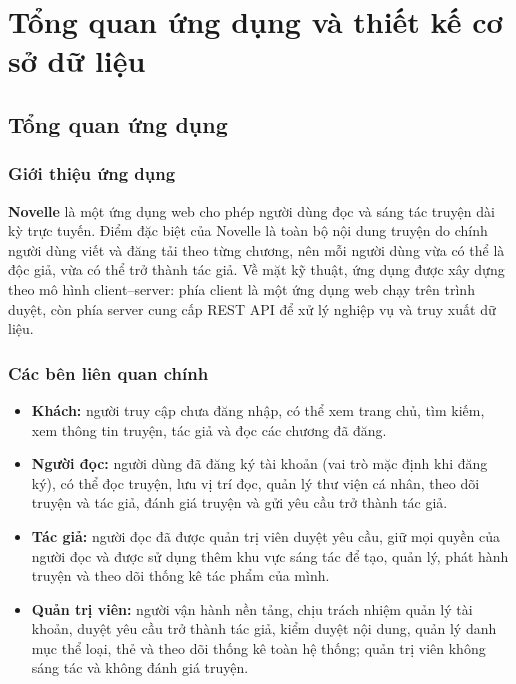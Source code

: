 \section{Tổng quan ứng dụng và thiết kế cơ sở dữ liệu}
\label{sec:app-db-design}

\subsection{Tổng quan ứng dụng}
\label{subsec:app-overview}

\subsubsection{Giới thiệu ứng dụng}

\textbf{Novelle} là một ứng dụng web cho phép người dùng đọc và sáng tác truyện dài kỳ trực tuyến. Điểm đặc biệt của Novelle là toàn bộ nội dung truyện do chính người dùng viết và đăng tải theo từng chương, nên mỗi người dùng vừa có thể là độc giả, vừa có thể trở thành tác giả. Về mặt kỹ thuật, ứng dụng được xây dựng theo mô hình client--server: phía client là một ứng dụng web chạy trên trình duyệt, còn phía server cung cấp REST API để xử lý nghiệp vụ và truy xuất dữ liệu.

\subsubsection{Các bên liên quan chính}
\label{subsubsec:stakeholders}

\begin{itemize}
    \item \textbf{Khách:} người truy cập chưa đăng nhập, có thể xem trang chủ, tìm kiếm, xem thông tin truyện, tác giả và đọc các chương đã đăng.
    \item \textbf{Người đọc:} người dùng đã đăng ký tài khoản (vai trò mặc định khi đăng ký), có thể đọc truyện, lưu vị trí đọc, quản lý thư viện cá nhân, theo dõi truyện và tác giả, đánh giá truyện và gửi yêu cầu trở thành tác giả.
    \item \textbf{Tác giả:} người đọc đã được quản trị viên duyệt yêu cầu, giữ mọi quyền của người đọc và được sử dụng thêm khu vực sáng tác để tạo, quản lý, phát hành truyện và theo dõi thống kê tác phẩm của mình.
    \item \textbf{Quản trị viên:} người vận hành nền tảng, chịu trách nhiệm quản lý tài khoản, duyệt yêu cầu trở thành tác giả, kiểm duyệt nội dung, quản lý danh mục thể loại, thẻ và theo dõi thống kê toàn hệ thống; quản trị viên không sáng tác và không đánh giá truyện.
\end{itemize}

